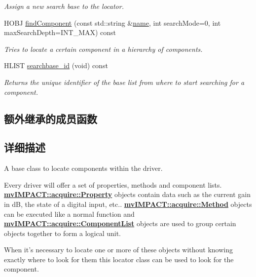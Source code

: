 \begin{DoxyCompactItemize}
\begin{DoxyCompactList}\small\item\em Assign a new search base to the locator. \end{DoxyCompactList}\item 
H\+O\+B\+J \hyperlink{classmv_i_m_p_a_c_t_1_1acquire_1_1_component_locator_base_a2b3d738296e53a5d2a0cc5bdcaa2304b}{find\+Component} (const std\+::string \&\hyperlink{classmv_i_m_p_a_c_t_1_1acquire_1_1_component_access_aee8b40bfc45b5752e03570afaadce217}{name}, int search\+Mode=0, int max\+Search\+Depth=I\+N\+T\+\_\+\+M\+A\+X) const 
\begin{DoxyCompactList}\small\item\em Tries to locate a certain component in a hierarchy of components. \end{DoxyCompactList}\item 
H\+L\+I\+S\+T \hyperlink{classmv_i_m_p_a_c_t_1_1acquire_1_1_component_locator_base_a0380fa414baee7f123736f105ff1a378}{searchbase\+\_\+id} (void) const 
\begin{DoxyCompactList}\small\item\em Returns the unique identifier of the base list from where to start searching for a component. \end{DoxyCompactList}\end{DoxyCompactItemize}
\subsection*{额外继承的成员函数}


\subsection{详细描述}
A base class to locate components within the driver. 

Every driver will offer a set of properties, methods and component lists. {\bfseries \hyperlink{classmv_i_m_p_a_c_t_1_1acquire_1_1_property}{mv\+I\+M\+P\+A\+C\+T\+::acquire\+::\+Property}} objects contain data such as the current gain in d\+B, the state of a digital input, etc.. {\bfseries \hyperlink{classmv_i_m_p_a_c_t_1_1acquire_1_1_method}{mv\+I\+M\+P\+A\+C\+T\+::acquire\+::\+Method}} objects can be executed like a normal function and {\bfseries \hyperlink{classmv_i_m_p_a_c_t_1_1acquire_1_1_component_list}{mv\+I\+M\+P\+A\+C\+T\+::acquire\+::\+Component\+List}} objects are used to group certain objects together to form a logical unit.

When it's necessary to locate one or more of these objects without knowing exactly where to look for them this locator class can be used to look for the component. 

